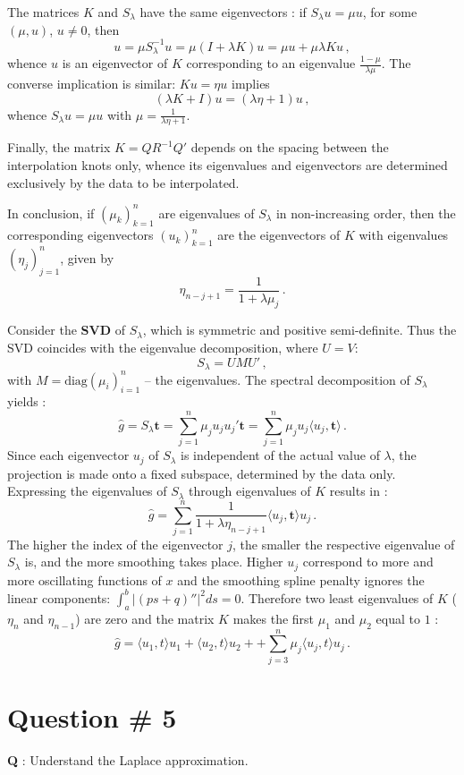 \documentclass[a4paper]{article}
\begin{document}
The matrices $K$ and $S_\lambda$ have the same eigenvectors : if $S_\lambda u = \mu u$,
for some $(\mu, u)$, $u\neq 0$, then
\[
u
= \mu S_\lambda^{-1} u
= \mu (I+\lambda K) u
= \mu u + \mu \lambda K u\,,
\]
whence $u$ is an eigenvector of $K$ corresponding to an eigenvalue $\frac{1-\mu}{\lambda \mu}$.
The converse implication is similar: $K u = \eta u$ implies
\[ ( \lambda K + I ) u = ( \lambda \eta + 1 ) u \,, \]
whence $S_\lambda u = \mu u$ with $\mu = \frac{1}{\lambda \eta + 1}$.

Finally, the matrix $K = Q R^{-1} Q'$ depends on the spacing between the interpolation
knots only, whence its eigenvalues and eigenvectors are determined exclusively by the
data to be interpolated.

In conclusion, if $(\mu_k)_{k=1}^n$ are eigenvalues of $S_\lambda$ in non-increasing
order, then the corresponding eigenvectors $(u_k)_{k=1}^n$ are the eigenvectors
of $K$ with eigenvalues $(\eta_j)_{j=1}^n$, given by 
\[ \eta_{n-j+1} = \frac{1}{1 + \lambda \mu_j} \,. \]

Consider the \textbf{SVD} of $S_\lambda$, which is symmetric and positive semi-definite.
Thus the SVD coincides with the eigenvalue decomposition, where $U = V$: 
\[ S_\lambda = U M U' \,, \]
with $M = \text{diag}(\mu_i)_{i=1}^n$ -- the eigenvalues. The spectral decomposition
of $S_\lambda$ yields :
\[
\hat{g}
= S_\lambda \mathbf{t}
= \sum_{j=1}^n \mu_j u_j u_j' \mathbf{t}
= \sum_{j=1}^n \mu_j u_j \langle u_j, \mathbf{t} \rangle\,.
\]
Since each eigenvector $u_j$ of $S_\lambda$ is independent of the actual value
of $\lambda$, the projection is made onto a fixed subspace, determined by the data
only.
Expressing the eigenvalues of $S_\lambda$ through eigenvalues of $K$ results in :
\[
\hat{g}
= \sum_{j=1}^n \frac{1}{1 + \lambda \eta_{n-j+1}} \langle u_j, \mathbf{t} \rangle u_j \,.
\]
The higher the index of the eigenvector $j$, the smaller the respective eigenvalue
of $S_\lambda$ is, and the more smoothing takes place. Higher $u_j$ correspond to
more and more oscillating functions of $x$ and the smoothing spline penalty ignores
the linear components: $\int_a^b | (p s + q)'' |^2 ds = 0$. Therefore two least
eigenvalues of $K$ ($\eta_n$ and $\eta_{n-1}$) are zero and the matrix $K$ makes
the first $\mu_1$ and $\mu_2$ equal to $1$ :
\[
\hat{g} =
\langle u_1, t \rangle u_1 + \langle u_2, t \rangle u_2 +
+ \sum_{j=3}^n \mu_j \langle u_j, t \rangle u_j\,.
\]

\clearpage

\section[Laplace]{Question \# 5} %
\label{sec:question_5}
\textbf{\large \textbf{Q}} : Understand the Laplace approximation.
\end{document}
